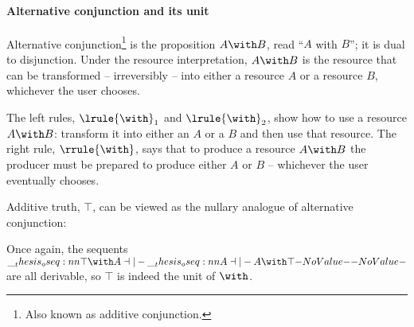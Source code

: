 \paragraph{Alternative conjunction and its unit}
Alternative conjunction\footnote{Also known as additive conjunction.} is the proposition $A \with B$, read \enquote{$A$ with $B$};
it is dual to disjunction.
Under the resource interpretation, $A \with B$ is the resource that can be transformed -- irreversibly -- into either a resource $A$ or a resource $B$, whichever the user chooses.
The left rules, $\lrule{\with}_1$ and $\lrule{\with}_2$, show how to use a resource $A \with B$: transform it into either an $A$ or a $B$ and then use that resource.
The right rule, $\rrule{\with}$, says that to produce a resource $A \with B$ the producer must be prepared to produce either $A$ or $B$ -- whichever the user eventually chooses.

Additive truth, $\top$, can be viewed as the nullary analogue of alternative conjunction:
Once again, the sequents $\oseq{\top \with A \dashv|- \oseq{A \dashv|- A \with \top}}$ are all derivable, so $\top$ is indeed the unit of $\with$.


